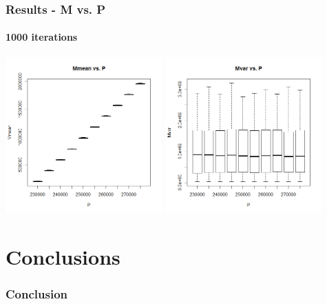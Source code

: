 \begin{frame}
    \frametitle{Results - M vs. P }
	\framesubtitle{1000 iterations}
\hspace*{-5mm}
\includegraphics[height=6cm]{boxplot1000_mmean_P}
\includegraphics[height=6cm]{boxplot1000_mvar_P}
\end{frame}






\section{Conclusions}

\begin{frame}
    \frametitle{Conclusion}
\end{frame}




